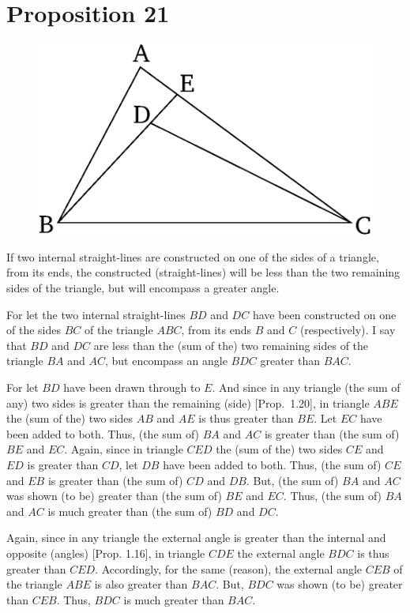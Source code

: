 \chapter*{Proposition 21}
\label{prop:21}

\begin{figure}[ht]
    \begin{center}
    \includegraphics[width=0.5\linewidth]{figures/fig21e.eps}
    \label{fig:prop_21}
    \end{center}
\end{figure}

If two internal straight-lines are constructed on one of the sides
of a triangle, from its ends, 
the constructed (straight-lines) will be less than the two remaining 
sides of the triangle, but will encompass a greater angle.

For let the two internal straight-lines $BD$ and $DC$ have been constructed on one of the sides $BC$ of the triangle $ABC$, from its ends $B$ and $C$ (respectively). I say that 
$BD$ and $DC$ are less than the (sum of the) two  remaining sides of the triangle
$BA$ and $AC$, but encompass an angle $BDC$ greater than $BAC$.

For let $BD$ have been drawn through to $E$. And since in any
triangle (the sum of any) two sides is greater than the remaining (side) [Prop.~1.20],
 in triangle $ABE$ the  (sum of the) two sides $AB$ and $AE$ is thus  greater than
$BE$. Let $EC$ have been added to both. Thus, (the sum of) $BA$ and $AC$ is greater
than (the sum of) $BE$ and $EC$.  Again, since in triangle $CED$ the (sum of the) two sides $CE$ and $ED$
is  greater than $CD$, let $DB$ have been added to both. Thus, 
(the sum of) $CE$ and $EB$ is greater than  (the sum of) $CD$ and $DB$. But, (the sum of) $BA$ and $AC$ was shown
(to be) greater than (the sum of) $BE$
 and $EC$. Thus, (the sum of) $BA$ and $AC$ is much greater than
(the sum of) $BD$ and $DC$.

Again, since in any  triangle the external angle 
is greater than the internal and opposite (angles) [Prop. 1.16],
 in triangle $CDE$ the external angle $BDC$ is thus greater
than $CED$.  Accordingly, for the same (reason),  the external angle $CEB$ of the
triangle $ABE$ is also greater than $BAC$. But, $BDC$ was shown (to be) 
greater
than $CEB$. Thus, $BDC$ is much greater than $BAC$.

